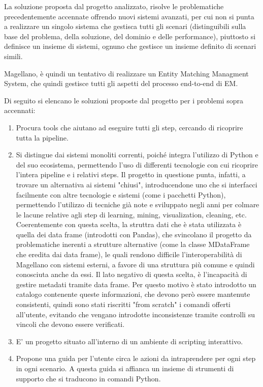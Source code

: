 La soluzione proposta dal progetto analizzato, risolve le problematiche precedentemente accennate offrendo nuovi sistemi avanzati, per cui non si punta a realizzare un singolo sistema che gestisca tutti gli scenari (distinguibili sulla base del problema, della soluzione, del dominio e delle performance), piuttosto si definisce un insieme di sistemi, ognuno che gestisce un insieme definito di scenari simili. 

Magellano, è quindi un tentativo di realizzare un Entity Matching Managment System, che quindi gestisce tutti gli aspetti del processo end-to-end di EM.

Di seguito si elencano le soluzioni proposte dal progetto per i problemi sopra accennati:

\begin{enumerate}
    \item Procura tools che aiutano ad eseguire tutti gli step, cercando di ricoprire tutta la pipeline.
    \item Si distingue dai sistemi monoliti correnti, poiché integra l'utilizzo di Python e del suo ecosistema, permettendo l'uso di differenti tecnologie con cui ricoprire l'intera pipeline e i relativi steps. Il progetto in questione punta, infatti, a trovare un alternativa ai sistemi "chiusi", introducendone uno che si interfacci facilmente con altre tecnologie e sistemi (come i pacchetti Python), permettendo l'utilizzo di tecniche già note e sviluppato negli anni per colmare le lacune relative agli step di learning, mining, visualization, cleaning, etc. Coerentemente con questa scelta, la struttra dati che è stata utilizzata è quella dei data frame (introdotti con Pandas), che svincolano il progetto da problematiche inerenti a strutture alternative (come la classe MDataFrame che eredita dai data frame), le quali rendono difficile l'interoperabilità di Magellano con sistemi esterni, a favore di una struttura più comune e quindi conosciuta anche da essi. Il lato negativo di questa scelta, è l'incapacità di gestire metadati tramite data frame. Per questo motivo è stato introdotto un catalogo contenente queste informazioni, che devono però essere mantenute consistenti, quindi sono stati riscritti "from scratch" i comandi offerti all'utente, evitando che vengano introdotte inconsistenze tramite controlli su vincoli che devono essere verificati.
    \item E' un progetto situato all'interno di un ambiente di scripting interattivo.
    \item Propone una guida per l'utente circa le azioni da intraprendere per ogni step in ogni scenario. A questa guida si affianca un insieme di strumenti di supporto che si traducono in comandi Python.
\end{enumerate}

